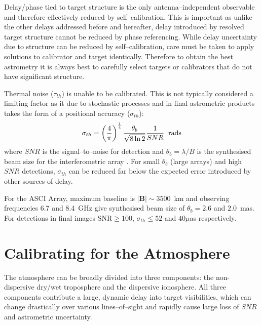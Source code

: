 		Delay/phase tied to target structure is the only antenna--independent observable and therefore effectively reduced by self--calibration. This is important as unlike the other delays addressed before and hereafter, delay introduced by resolved target structure cannot be reduced by phase referencing. While delay uncertainty due to structure can be reduced by self--calibration, care must be taken to apply solutions to calibrator and target identically. Therefore to obtain the best astrometry it is always best to carefully select targets or calibrators that do not have significant structure. 
		
		Thermal noise ($\tau_{th}$) is unable to be calibrated. This is not typically considered a limiting factor as it due to stochastic processes and in final astrometric products takes the form of a positional accuracy ($\sigma_{th}$):
		\begin{equation}
			\sigma_{th} = \left(\frac{4}{\pi}\right)^\frac{1}{4}\frac{\theta_b}{\sqrt{8\ln 2}}\frac{1}{SNR}\hspace{0.2cm}\text{rads}
		\end{equation} where $SNR$ is the signal--to--noise for detection and $\theta_b=\lambda/B$ is the synthesised beam size for the interferometric array \citep{Reid1988}. For small $\theta_b$ (large arrays) and high $SNR$ detections, $\sigma_{th}$ can be reduced far below the expected error introduced by other sources of delay.
		
		For the ASCI Array, maximum baseline is $|\textbf{B}|\sim3500$~km and observing frequencies 6.7 and 8.4~GHz give synthesised beam size of $\theta_b=2.6$ and $2.0$~mas. For detections in final images $\text{SNR}\ge100$, $\sigma_{th}\le52$ and $40\mu$as respectively.
	
\section{Calibrating for the Atmosphere} \label{sec:atmosphericcalibration}
	The atmosphere can be broadly divided into three components: the non-dispersive dry/wet troposphere and the dispersive ionosphere. All three components contribute a large, dynamic delay into target visibilities, which can change drastically over various lines--of--sight and rapidly cause large loss of $SNR$ and astrometric uncertainty.
	

